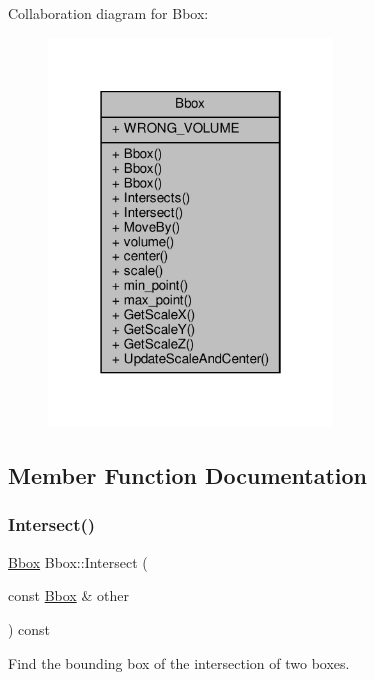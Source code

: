 Collaboration diagram for Bbox\+:\nopagebreak
\begin{figure}[H]
\begin{center}
\leavevmode
\includegraphics[width=214pt]{classBbox__coll__graph}
\end{center}
\end{figure}


\subsection{Member Function Documentation}
\mbox{\label{classBbox_a0b8e77b794311da86b4c09ed2919af0f}} 
\subsubsection{\texorpdfstring{Intersect()}{Intersect()}}
{\footnotesize\ttfamily \hyperlink{classBbox}{Bbox} Bbox\+::\+Intersect (\begin{DoxyParamCaption}\item[{const \hyperlink{classBbox}{Bbox} \&}]{other }\end{DoxyParamCaption}) const}



Find the bounding box of the intersection of two boxes. 


